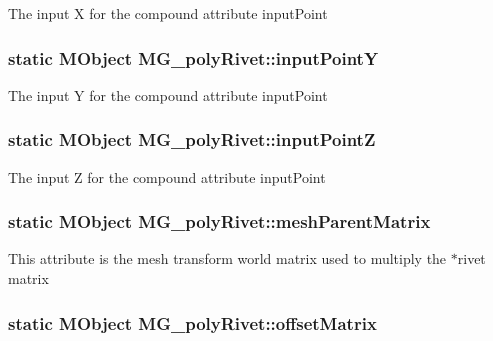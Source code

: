 The input X for the compound attribute input\-Point \hypertarget{class_m_g__poly_rivet_a2adde2d1b24113e0674eff68ac098cd5}{
\subsubsection[{input\-Point\-Y}]{\setlength{\rightskip}{0pt plus 5cm}static M\-Object M\-G\-\_\-poly\-Rivet\-::input\-Point\-Y\hspace{0.3cm}{\ttfamily [static]}}}\label{class_m_g__poly_rivet_a2adde2d1b24113e0674eff68ac098cd5}
The input Y for the compound attribute input\-Point \hypertarget{class_m_g__poly_rivet_ac16ba069fedb3f1e0b6991ab7f43891a}{
\subsubsection[{input\-Point\-Z}]{\setlength{\rightskip}{0pt plus 5cm}static M\-Object M\-G\-\_\-poly\-Rivet\-::input\-Point\-Z\hspace{0.3cm}{\ttfamily [static]}}}\label{class_m_g__poly_rivet_ac16ba069fedb3f1e0b6991ab7f43891a}
The input Z for the compound attribute input\-Point \hypertarget{class_m_g__poly_rivet_a922ab768d29ec0c21e3fbdaad23e83ab}{
\subsubsection[{mesh\-Parent\-Matrix}]{\setlength{\rightskip}{0pt plus 5cm}static M\-Object M\-G\-\_\-poly\-Rivet\-::mesh\-Parent\-Matrix\hspace{0.3cm}{\ttfamily [static]}}}\label{class_m_g__poly_rivet_a922ab768d29ec0c21e3fbdaad23e83ab}
This attribute is the mesh transform world matrix used to multiply the $\ast$rivet matrix \hypertarget{class_m_g__poly_rivet_a40686ba1ddd87b87272592bcbff78116}{
\subsubsection[{offset\-Matrix}]{\setlength{\rightskip}{0pt plus 5cm}static M\-Object M\-G\-\_\-poly\-Rivet\-::offset\-Matrix\hspace{0.3cm}{\ttfamily [static]}}}\label{class_m_g__poly_rivet_a40686ba1ddd87b87272592bcbff78116}
